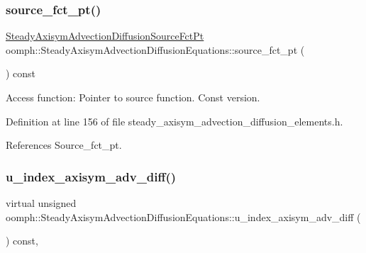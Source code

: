 \subsubsection{\texorpdfstring{source\+\_\+fct\+\_\+pt()}{source\_fct\_pt()}\hspace{0.1cm}{\footnotesize\ttfamily [2/2]}}
{\footnotesize\ttfamily \hyperlink{classoomph_1_1SteadyAxisymAdvectionDiffusionEquations_a1a8121ed2ce92dc69aa85c71975489d0}{Steady\+Axisym\+Advection\+Diffusion\+Source\+Fct\+Pt} oomph\+::\+Steady\+Axisym\+Advection\+Diffusion\+Equations\+::source\+\_\+fct\+\_\+pt (\begin{DoxyParamCaption}{ }\end{DoxyParamCaption}) const\hspace{0.3cm}{\ttfamily [inline]}}



Access function\+: Pointer to source function. Const version. 



Definition at line 156 of file steady\+\_\+axisym\+\_\+advection\+\_\+diffusion\+\_\+elements.\+h.



References Source\+\_\+fct\+\_\+pt.

\mbox{\label{classoomph_1_1SteadyAxisymAdvectionDiffusionEquations_ab56bb475d2985b9278b9c6a0ba5b89b3}} 
\subsubsection{\texorpdfstring{u\+\_\+index\+\_\+axisym\+\_\+adv\+\_\+diff()}{u\_index\_axisym\_adv\_diff()}}
{\footnotesize\ttfamily virtual unsigned oomph\+::\+Steady\+Axisym\+Advection\+Diffusion\+Equations\+::u\+\_\+index\+\_\+axisym\+\_\+adv\+\_\+diff (\begin{DoxyParamCaption}{ }\end{DoxyParamCaption}) const\hspace{0.3cm}{\ttfamily [inline]}, {\ttfamily [virtual]}}



